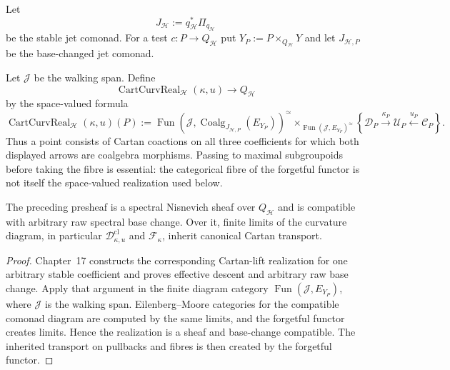 Let
\[
J_{\mathcal H}:=q_{\mathcal H}^*\Pi_{q_{\mathcal H}}
\]
be the stable jet comonad.  For a test $c:P\to Q_{\mathcal H}$ put
$Y_P:=P\times_{Q_{\mathcal H}}Y$ and let $J_{\mathcal H,P}$ be the base-changed
jet comonad.

\begin{definition}
\label{def:prequantum-cartan-curvature-realization}
Let $\mathscr J$ be the walking span.  Define
\[
\boxed{
\operatorname{CartCurvReal}_{\mathcal H}(\kappa,u)
\longrightarrow Q_{\mathcal H}
}
\]
by the space-valued formula
\[
\boxed{
\operatorname{CartCurvReal}_{\mathcal H}(\kappa,u)(P)
:=
\operatorname{Fun}\!\left(
 \mathscr J,
 \operatorname{Coalg}_{J_{\mathcal H,P}}(E_{Y_P})
\right)^{\simeq}
\times_{\operatorname{Fun}(\mathscr J,E_{Y_P})^{\simeq}}
\left\{
\mathscr D_P\xrightarrow{\kappa_P}\mathscr U_P
\xleftarrow{u_P}\mathscr C_P
\right\}.
}
\]
Thus a point consists of Cartan coactions on all three coefficients for which
both displayed arrows are coalgebra morphisms.  Passing to maximal subgroupoids
before taking the fibre is essential: the categorical fibre of the forgetful
functor is not itself the space-valued realization used below.
\end{definition}

\begin{proposition}
\label{prop:prequantum-cartan-curvature-descent-base-change}
The preceding presheaf is a spectral Nisnevich sheaf over $Q_{\mathcal H}$ and is
compatible with arbitrary raw spectral base change.  Over it, finite limits of the
curvature diagram, in particular
$\mathscr D^{\mathrm{cl}}_{\kappa,u}$ and $\mathscr F_\kappa$, inherit canonical
Cartan transport.
\end{proposition}

\begin{proof}
Chapter~17 constructs the corresponding Cartan-lift realization for one arbitrary
stable coefficient and proves effective descent and arbitrary raw base change.
Apply that argument in the finite diagram category
$\operatorname{Fun}(\mathscr J,E_{Y_P})$, where $\mathscr J$ is the walking span.
Eilenberg--Moore categories for the compatible comonad diagram are computed by the
same limits, and the forgetful functor creates limits.  Hence the realization is a
sheaf and base-change compatible.  The inherited transport on pullbacks and fibres
is then created by the forgetful functor.
\end{proof}

